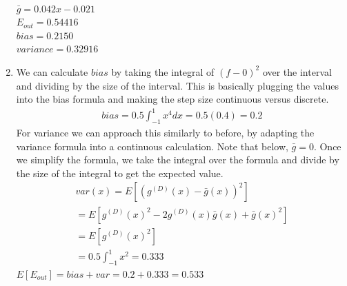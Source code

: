 \documentclass[12pt]{article}
\begin{document}
\begin{enumerate}[label=(\alph*)]
	\\ $\bar{g} = 0.042x-0.021$
	\\ $E_{out} = 0.54416$
	\\ $bias = 0.2150$
	\\ $variance = 0.32916$
	\item We can calculate $bias$ by taking the integral of $(f - 0)^2$ over the interval and dividing by the size of the interval. This is basically plugging the values into the bias formula and making the step size continuous versus discrete.
	\begin{gather*}
	bias = 0.5 \int_{-1}^{1}x^4 dx = 0.5(0.4) = \boldsymbol{0.2}
	\end{gather*}
	For variance we can approach this similarly to before, by adapting the variance formula into a continuous calculation. Note that below, $\bar{g} = 0$. Once we simplify the formula, we take the integral over the formula and divide by the size of the integral to get the expected value.
	\begin{gather*}
	var(x) = E[(g^{(D)}(x) - \bar{g}(x))^2]
	\\ = E[g^{(D)}(x)^2 - 2g^{(D)}(x)\bar{g}(x) + \bar{g}(x)^2]
	\\ = E[g^{(D)}(x)^2]
	\\ = 0.5 \int_{-1}^{1}x^2 = \boldsymbol{0.333}
	\end{gather*}
	$E[E_{out}] = bias + var = 0.2 + 0.333 = \boldsymbol{0.533}$
\end{enumerate}
\end{document}
